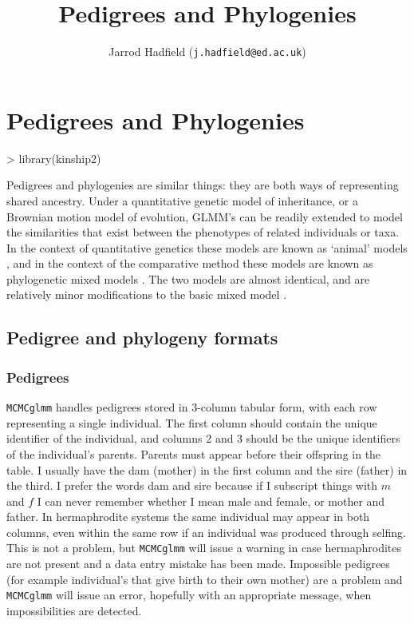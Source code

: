 \documentclass{article}
\title{Pedigrees and Phylogenies}
\author{Jarrod Hadfield (\texttt{j.hadfield@ed.ac.uk})}
\begin{document}
\maketitle
\else
\chapter{Pedigrees and Phylogenies}
\label{chap6}
\fi
\begin{Schunk}
\begin{Sinput}
> library(kinship2)
\end{Sinput}
\end{Schunk}



Pedigrees and phylogenies are similar things: they are both ways of representing shared ancestry. Under a quantitative genetic model of inheritance, or a Brownian motion model of evolution, GLMM's can be readily extended to model the similarities that exist between the phenotypes of related individuals or taxa.  In the context of quantitative genetics these models are known as `animal' models \citep{Henderson.1976}, and in the context of the comparative method these models are known as phylogenetic mixed models \citep{Lynch.1991}. The two models are almost identical, and are relatively minor modifications to the basic mixed model \citep{Hadfield.2010b}. 


\section{Pedigree and phylogeny formats}

\subsection{Pedigrees}

\texttt{MCMCglmm} handles pedigrees stored in 3-column tabular form, with each row representing a single individual. The first column should contain the unique identifier of the individual, and columns 2 and 3 should be the unique identifiers of the individual's parents. Parents must appear before their offspring in the table. I usually have the dam (mother) in the first column and the sire (father) in the third. I prefer the words dam and sire because if I subscript things with $m$ and $f$ I can never remember whether I mean male and female, or mother and father. In hermaphrodite systems the same individual may appear in both columns, even within the same row if an individual was produced through selfing.  This is not a problem, but \texttt{MCMCglmm} will issue a warning in case hermaphrodites are not present and a data entry mistake has been made. Impossible pedigrees (for example individual's that give birth to their own mother) are a problem and \texttt{MCMCglmm} will issue an error, hopefully with an appropriate message, when impossibilities are detected.\\
\end{document}
